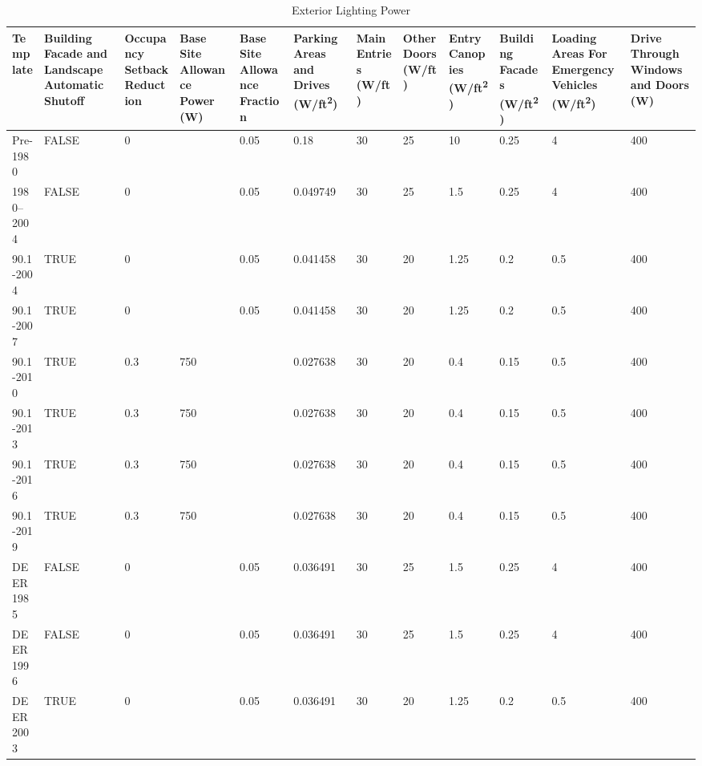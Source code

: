 \begin{table}
\centering
\scriptsize
\caption{Exterior Lighting Power}
\label{tab:exterior_lighting_power}
\begin{tabular}{|p{0.5in}|p{0.3in}|p{0.4in}|p{0.3in}|p{0.3in}|p{0.35in}|p{0.3in}|p{0.3in}|p{0.35in}|p{0.3in}|p{0.35in}|p{0.35in}|}
\hline
\textbf{Template} & \textbf{Building Facade and Landscape Automatic Shutoff} & \textbf{Occupancy Setback Reduction} & \textbf{Base Site Allowance Power (W)} & \textbf{Base Site Allowance Fraction} & \textbf{Parking Areas and Drives (W/ft\textsuperscript{2})} & \textbf{Main Entries (W/ft)} & \textbf{Other Doors (W/ft)} & \textbf{Entry Canopies (W/ft\textsuperscript{2})} & \textbf{Building Facades (W/ft\textsuperscript{2})} & \textbf{Loading Areas For Emergency Vehicles (W/ft\textsuperscript{2})} & \textbf{Drive Through Windows and Doors (W)}  \\
\hline
Pre-1980          & FALSE & 0   &                         & 0.05   & 0.18     & 30 & 25 & 10   & 0.25 & 4     & 400 \\ \hline
1980--2004         & FALSE & 0   &                         & 0.05   & 0.049749 & 30 & 25 & 1.5  & 0.25 & 4     & 400 \\ \hline
90.1-2004         & TRUE  & 0   &                         & 0.05   & 0.041458 & 30 & 20 & 1.25 & 0.2  & 0.5   & 400 \\ \hline
90.1-2007         & TRUE  & 0   &                         & 0.05   & 0.041458 & 30 & 20 & 1.25 & 0.2  & 0.5   & 400 \\ \hline
90.1-2010         & TRUE  & 0.3 & 750                     &        & 0.027638 & 30 & 20 & 0.4  & 0.15 & 0.5   & 400 \\ \hline
90.1-2013         & TRUE  & 0.3 & 750                     &        & 0.027638 & 30 & 20 & 0.4  & 0.15 & 0.5   & 400 \\ \hline
90.1-2016         & TRUE  & 0.3 & 750                     &        & 0.027638 & 30 & 20 & 0.4  & 0.15 & 0.5   & 400 \\ \hline
90.1-2019         & TRUE  & 0.3 & 750                     &        & 0.027638 & 30 & 20 & 0.4  & 0.15 & 0.5   & 400 \\ \hline
DEER 1985         & FALSE & 0   &                         & 0.05   & 0.036491 & 30 & 25 & 1.5  & 0.25 & 4     & 400 \\ \hline
DEER 1996         & FALSE & 0   &                         & 0.05   & 0.036491 & 30 & 25 & 1.5  & 0.25 & 4     & 400 \\ \hline
DEER 2003         & TRUE  & 0   &                         & 0.05   & 0.036491 & 30 & 20 & 1.25 & 0.2  & 0.5   & 400 \\ \hline

\end{tabular}
\end{table}
